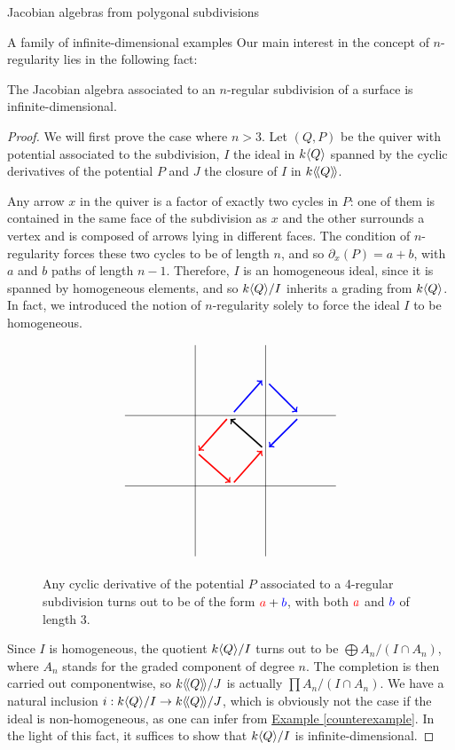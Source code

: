 \begin{chapter}{Jacobian algebras from polygonal subdivisions}
\begin{section}{A family of infinite-dimensional examples}
Our main interest in the concept of $n$-regularity lies in the following fact:

\begin{thm} The Jacobian algebra associated to an $n$-regular subdivision of a surface is infinite-dimensional.
\end{thm}
\begin{proof} We will first prove the case where $n>3$. Let $(Q,P)$ be the quiver with potential associated to the subdivision, $I$ the ideal in $k\langle Q\rangle$ spanned by the cyclic derivatives of the potential $P$ and $J$ the closure of $I$ in $k\langle\!\langle Q\rangle\!\rangle$. 

Any arrow $x$ in the quiver is a factor of exactly two cycles in $P$: one of them is contained in the same face of the subdivision as $x$ and the other surrounds a vertex and is composed of arrows lying in different faces. The condition of $n$-regularity forces these two cycles to be of length $n$, and so $\partial_x(P)= a+b$, with $a$ and $b$ paths of length $n-1$. Therefore, $I$ is an homogeneous ideal, since it is spanned by homogeneous elements, and so $k\langle Q\rangle/I$ inherits a grading from $k\langle Q\rangle$. In fact, we introduced the notion of $n$-regularity solely to force the ideal $I$ to be homogeneous.

\begin{figure}[h]
\[
\begin{tikzpicture}[scale=1]
\draw (-3,1) to (3,1);
\draw (-3, -1) to (3, -1);
\draw (-1, -3) to (-1, 3);
\draw (1, -3) to (1, 3);
\draw[very thick, ->] (0.9, 0.1) to (0, 0.9);
\draw[red, very thick, ->] (-0.1, 0.9) to (-0.9, 0);
\draw[red, very thick, ->] (-0.9, -0.1) to (0, -0.9);
\draw[red, very thick, ->] (0.1, -0.9) to (0.9, 0);
\draw[blue, very thick, ->] (0.1, 1.1) to (0.9, 2);
\draw[blue, very thick, ->] (1.1, 1.9) to (1.9, 1.1);
\draw[blue, very thick, ->] (1.9, 0.9) to (1.1, 0.1);
\end{tikzpicture}
\]
\begin{caption}{Any cyclic derivative of the potential $P$ associated to a 4-regular subdivision turns out to be of the form $\textcolor{red}{a} + \textcolor{blue}{b}$, with both $\textcolor{red}{a}$ and $\textcolor{blue}{b}$ of length 3.}
\end{caption}
\end{figure}

Since $I$ is homogeneous, the quotient $k\langle Q\rangle/I$ turns out to be $\bigoplus A_n/(I\cap A_n)$, where $A_n$ stands for the graded component of degree $n$. The completion is then carried out componentwise, so $k\langle\!\langle Q\rangle\!\rangle/J$ is actually $\prod A_n/(I\cap A_n)$. We have a natural inclusion $i:k\langle Q\rangle/I\to k\langle\!\langle Q\rangle\!\rangle/J$, which is obviously not the case if the ideal is non-homogeneous, as one can infer from \hyperref[counterexample]{Example \ref*{counterexample}}. In the light of this fact, it suffices to show that $k\langle Q\rangle/I$ is infinite-dimensional.


\end{proof}
\end{section}
\end{chapter}
